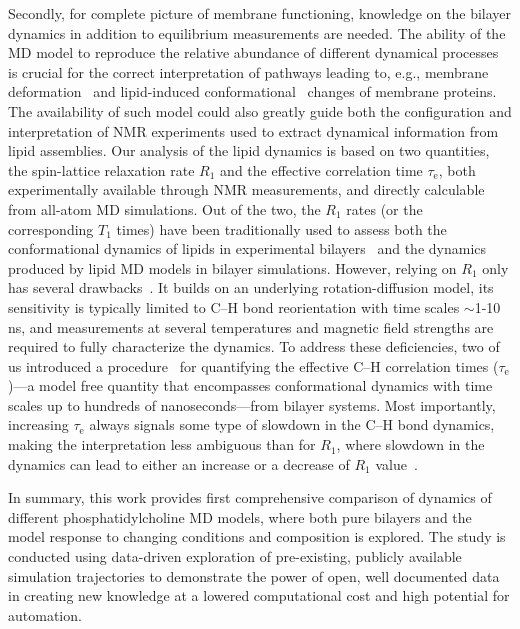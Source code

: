 \documentclass[journal=jpcbfk,manuscript=article,layout=twocolumn]{achemso}
\begin{document}
Secondly, for complete picture of membrane functioning, knowledge on the bilayer dynamics in addition to equilibrium measurements are needed. The ability of the MD model to reproduce the relative abundance of different dynamical processes is crucial for the correct interpretation of pathways leading to, e.g., membrane deformation~\cite{chernomordik08} and lipid-induced conformational~\cite{gibson93,phillips09} changes of membrane proteins. The availability of such model could also greatly guide both the configuration and interpretation of NMR experiments used to extract dynamical information from lipid assemblies. 
Our analysis of the lipid dynamics is based on two quantities, the spin-lattice relaxation rate $R_{1}$ and the effective correlation time $\tau_\mathrm{e}$, both experimentally available through NMR measurements, and directly calculable from all-atom MD simulations.
Out of the two, the $R_{1}$ rates (or the corresponding $T_{1}$ times) have been traditionally used to assess both the conformational dynamics of lipids in experimental bilayers~\cite{feller02,eldho03,wohlert06,klauda08,leftin11} and the dynamics produced by lipid MD models in bilayer simulations\cite{feller02,wohlert06,klauda08,klauda08II}. However, relying on $R_{1}$ only has several drawbacks~. It builds on an underlying rotation-diffusion model, its sensitivity is typically limited to C--H bond reorientation with time scales $\sim$1-10 ns, and measurements at several temperatures and magnetic field strengths are required to fully characterize the dynamics. To address these deficiencies, two of us introduced a procedure~\cite{ferreira15} for quantifying the effective C--H correlation times ($\tau_\mathrm{e}$)---a model free quantity that encompasses conformational dynamics with time scales up to hundreds of nanoseconds---from bilayer systems. Most importantly, increasing $\tau_\mathrm{e}$ always signals some type of slowdown in the C--H bond dynamics, making the interpretation less ambiguous than for $R_1$, where slowdown in the dynamics can lead to either an increase or a decrease of $R_{1}$ value~\cite{ferreira15}. 

In summary, this work provides first comprehensive comparison of dynamics of different phosphatidylcholine MD models, where both pure bilayers and the model response to changing conditions and composition is explored. The study is conducted using data-driven exploration of pre-existing, publicly available simulation trajectories to demonstrate the power of open, well documented data in creating new knowledge at a lowered computational cost and high potential for automation.  
\end{document}
